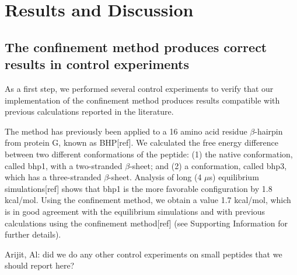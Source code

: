 \documentclass[12pt]{article}
\newcommand{\Justin}[1]{\color{blue}#1\normalcolor}
\begin{document}



\section{Results and Discussion}

\subsection{The confinement method produces correct results in control experiments}

As a first step, we performed several control experiments to verify that our implementation of the
confinement method produces results compatible with previous calculations reported in the
literature.

The method has previously been applied to a 16 amino acid residue $\beta$-hairpin from
protein G, known as BHP[ref]. We calculated the free energy difference between two different
conformations of the peptide: (1) the native conformation, called bhp1, with a two-stranded
$\beta$-sheet; and (2) a conformation, called bhp3, which has a three-stranded $\beta$-sheet.
Analysis of long (4 $\mu$s) equilibrium simulations[ref] shows that bhp1 is the more favorable
configuration by 1.8 kcal/mol. Using the confinement method, we obtain a value 1.7 kcal/mol, which
is in good agreement with the equilibrium simulations and with previous calculations using the
confinement method[ref] (see Supporting Information for further details).

\Justin{Arijit, Al: did we do any other control experiments on small peptides that we should report
here?}
\end{document}

